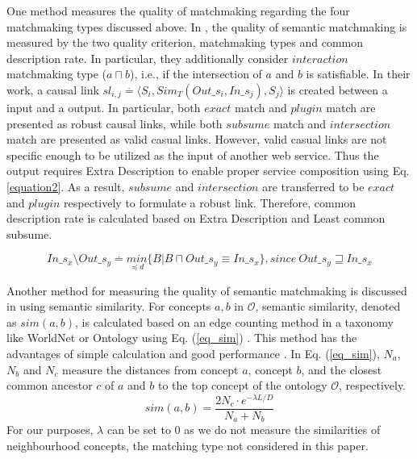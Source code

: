 One method measures the quality of matchmaking regarding the four matchmaking types discussed above. In \cite{lecue2007making}, the quality of semantic matchmaking is measured by the two quality criterion, matchmaking types and common description rate. In particular, they additionally consider $interaction$ matchmaking type ($a \sqcap b$), i.e., if the intersection of $a$ and $b$ is satisfiable. In their work, a causal link \begin{math} sl_{i,j} \stackrel{.}{=} \langle S_i, Sim_{T}(Out\_s_i,In\_s_j),S_j  \rangle \end{math} is created between a input and a output. In particular, both $exact$ match and $plugin$ match are presented as robust causal links, while both $subsume$ match and $intersection$ match are presented as valid casual links. However, valid casual links are not specific enough to be utilized as the input of another web service. Thus the output requires Extra Description to enable proper service composition using Eq. \ref{equation2}. As a result, $subsume$ and $intersection$ are transferred to be $exact$ and $plugin$ respectively to formulate a robust link. Therefore, common description rate is calculated based on Extra Description and Least common subsume.

\begin{equation}
In\_s_x \setminus Out\_s_y \stackrel{.}{=} \underset {\preceq d}{min} \{ B|B\sqcap  Out\_s_y \equiv In\_s_x  \} , since \  Out\_s_y \sqsupseteq In\_s_x
 \label{equation2}
\end{equation}


Another method for measuring the quality of semantic matchmaking is discussed in \cite{shet2012new} using semantic similarity. For concepts $a, b$ in $\mathcal{O}$, semantic similarity, denoted as $sim(a, b)$, is calculated based on an edge counting method in a taxonomy like WorldNet or Ontology using Eq. (\ref{eq_sim}) \cite{shet2012new}. This method has the advantages of simple calculation and good performance . In Eq. (\ref{eq_sim}), $N_a$, $N_b$ and $N_c$ measure the distances from concept $a$, concept $b$, and the closest common ancestor $c$ of $a$ and $b$ to the top concept of the ontology $\mathcal{O}$, respectively. 
\begin{equation}
sim(a, b){=} \frac{2N_c \cdot e^{-\lambda L/D} }{N_{a}+N_{b}}
\label{eq_sim}
\end{equation}
\noindent For our purposes, $\lambda$ can be set to 0 as we do not measure the similarities of neighbourhood concepts, the matching type not considered in this paper. 

